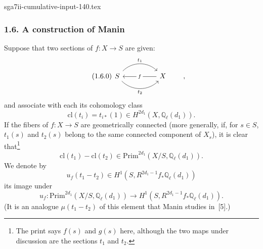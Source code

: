 \begin{filecontents*}{sga7ii-cumulative-input-140.tex}
\subsubsection*{1.6. A construction of Manin}
Suppose that two sections of $f:X\longrightarrow S$ are given:
\begin{equation}\tag{1.6.0}
\begin{tikzcd}[column sep=huge]
S \arrow[r, bend left=45, "t_1"]
  \arrow[r, bend right=45, "t_2"']
& X \arrow[l, "f" description]
\end{tikzcd}
\qquad ,
\end{equation}
and associate with each its cohomology class
\begin{equation}\tag{1.6.1}
\mathrm{cl}(t_i)=t_{i*}(1)
\in H^{2d_1}(X,\mathbb Q_\ell(d_1)).
\end{equation}
If the fibers of $f:X\longrightarrow S$ are geometrically connected
(more generally, if, for $s\in S$, $t_1(s)$ and $t_2(s)$ belong to the same
connected component of $X_s$), it is clear that\footnote{The print says
$f(s)$ and $g(s)$ here, although the two maps under discussion are the
sections $t_1$ and $t_2$.}
\begin{equation}\tag{1.6.2}
\mathrm{cl}(t_1)-\mathrm{cl}(t_2)
\in\mathrm{Prim}^{2d_1}(X/S,\mathbb Q_\ell(d_1)).
\end{equation}
We denote by
\begin{equation}\tag{1.6.3}
u_f(t_1-t_2)\in
H^1(S,R^{2d_1-1}f_*\mathbb Q_\ell(d_1))
\end{equation}
its image under
\begin{equation}\tag{1.6.4}
u_f:\mathrm{Prim}^{2d_1}(X/S,\mathbb Q_\ell(d_1))
\longrightarrow H^1(S,R^{2d_1-1}f_*\mathbb Q_\ell(d_1)).
\end{equation}
(It is an analogue $\mu(t_1-t_2)$ of this element that Manin studies
in~[5].)


\end{filecontents*}
